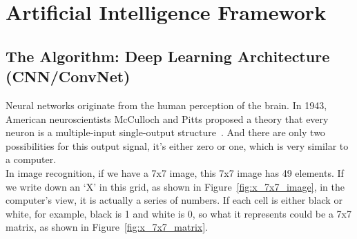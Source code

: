 \section{Artificial Intelligence Framework}
\label{sec:3.1}
\subsection{The Algorithm: Deep Learning Architecture (CNN/ConvNet)}

Neural networks originate from the human perception of the brain. In 1943, American neuroscientists McCulloch and Pitts proposed a theory that every neuron is a multiple-input single-output structure~\cite{mcculloch1943logical}. And there are only two possibilities for this output signal, it's either zero or one, which is very similar to a computer.\\

In image recognition, if we have a 7x7 image, this 7x7 image has 49 elements. If we write down an `X' in this grid, as shown in Figure~\ref{fig:x_7x7_image}, in the computer's view, it is actually a series of numbers. If each cell is either black or white, for example, black is 1 and white is 0, so what it represents could be a 7x7 matrix, as shown in Figure~\ref{fig:x_7x7_matrix}.\\


